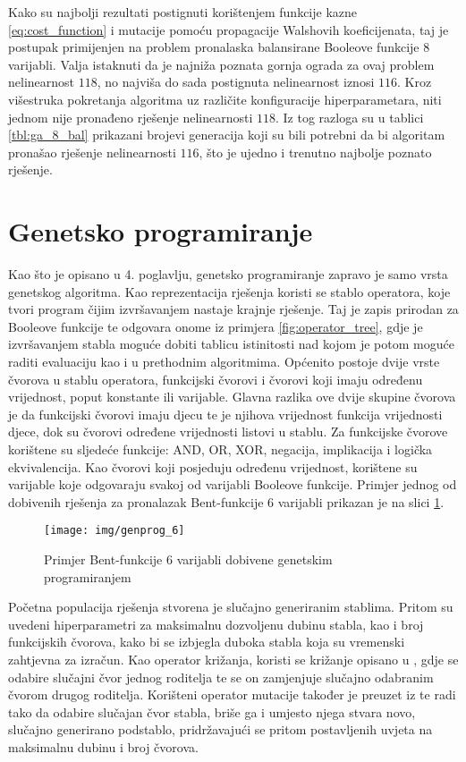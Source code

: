 Kako su najbolji rezultati postignuti korištenjem funkcije kazne \eqref{eq:cost_function} i mutacije pomoću propagacije Walshovih koeficijenata, taj je postupak primijenjen na problem pronalaska balansirane Booleove funkcije $8$ varijabli.
Valja istaknuti da je najniža poznata gornja ograda za ovaj problem nelinearnost $118$, no najviša do sada postignuta nelinearnost iznosi $116$.
Kroz višestruka pokretanja algoritma uz različite konfiguracije hiperparametara, niti jednom nije pronađeno rješenje nelinearnosti $118$.
Iz tog razloga su u tablici \ref{tbl:ga_8_bal} prikazani brojevi generacija koji su bili potrebni da bi algoritam pronašao rješenje nelinearnosti $116$, što je ujedno i trenutno najbolje poznato rješenje.

\section{Genetsko programiranje}
Kao što je opisano u 4. poglavlju, genetsko programiranje zapravo je samo vrsta genetskog algoritma.
Kao reprezentacija rješenja koristi se stablo operatora, koje tvori program čijim izvršavanjem nastaje krajnje rješenje.
Taj je zapis prirodan za Booleove funkcije te odgovara onome iz primjera \ref{fig:operator_tree}, gdje je izvršavanjem stabla moguće dobiti tablicu istinitosti nad kojom je potom moguće raditi evaluaciju kao i u prethodnim algoritmima.
Općenito postoje dvije vrste čvorova u stablu operatora, funkcijski čvorovi i čvorovi koji imaju određenu vrijednost, poput konstante ili varijable.
Glavna razlika ove dvije skupine čvorova je da funkcijski čvorovi imaju djecu te je njihova vrijednost funkcija vrijednosti djece, dok su čvorovi određene vrijednosti listovi u stablu.
Za funkcijske čvorove korištene su sljedeće funkcije: AND, OR, XOR, negacija, implikacija i logička ekvivalencija.
Kao čvorovi koji posjeduju određenu vrijednost, korištene su varijable koje odgovaraju svakoj od varijabli Booleove funkcije.
Primjer jednog od dobivenih rješenja za pronalazak Bent-funkcije $6$ varijabli prikazan je na slici \ref{fig:genprog_6}.

\begin{figure}[ht!]
    \centering
    \texttt{[image: img/genprog\_6]}
    \captionsetup{justification=centering}
    \caption{Primjer Bent-funkcije $6$ varijabli dobivene genetskim programiranjem}
    \label{fig:genprog_6}
\end{figure}

Početna populacija rješenja stvorena je slučajno generiranim stablima.
Pritom su uvedeni hiperparametri za maksimalnu dozvoljenu dubinu stabla, kao i broj funkcijskih čvorova, kako bi se izbjegla duboka stabla koja su vremenski zahtjevna za izračun.
Kao operator križanja, koristi se križanje opisano u \cite{PrirodomInspirirani}, gdje se odabire slučajni čvor jednog roditelja te se on zamjenjuje slučajno odabranim čvorom drugog roditelja.
Korišteni operator mutacije također je preuzet iz \cite{PrirodomInspirirani} te radi tako da odabire slučajan čvor stabla, briše ga i umjesto njega stvara novo, slučajno generirano podstablo, pridržavajući se pritom postavljenih uvjeta na maksimalnu dubinu i broj čvorova.

